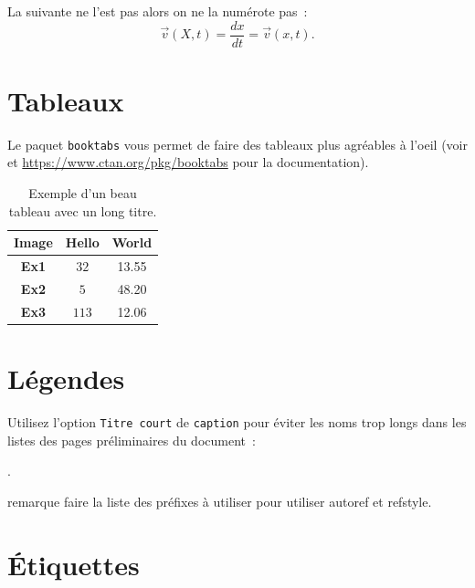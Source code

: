La suivante ne l'est pas alors on ne la numérote pas~:
\begin{equation*}
	\vec{v}(X,t)
	= \frac{dx}{dt} = \vec{v}(x,t).
\end{equation*}

\section{Tableaux}

Le paquet \texttt{booktabs} vous permet de faire des tableaux plus agréables à l'oeil (voir  et \url{https://www.ctan.org/pkg/booktabs} pour la documentation).

\begin{table}
	\centering
	\begin{tabular}{c c c}
		\toprule
		\textbf{Image}   & \textbf{Hello}   & \textbf{World}\\
		\hline
		\textbf{Ex1}  & $32$                  & 13.55 \\
		\textbf{Ex2}    & $5$                   & 48.20    \\
		\textbf{Ex3}    & $113$                 & 12.06    \\
		\bottomrule
	\end{tabular}
	\caption[Exemple d'un beau tableau]{Exemple d'un beau tableau avec un long
		titre.} \label{tab:table1}
\end{table}

\section{Légendes}
\label{sec:legendes}


Utilisez l'option \texttt{Titre court} de \texttt{caption} pour éviter les noms trop longs dans les listes des pages préliminaires du document~:

\begin{verb}
	\caption[Titre court]{Titre long}
\end{verb}.

remarque faire la liste des préfixes à utiliser pour utiliser autoref et refstyle.

\section{Étiquettes}
\label{sec:etiq}

